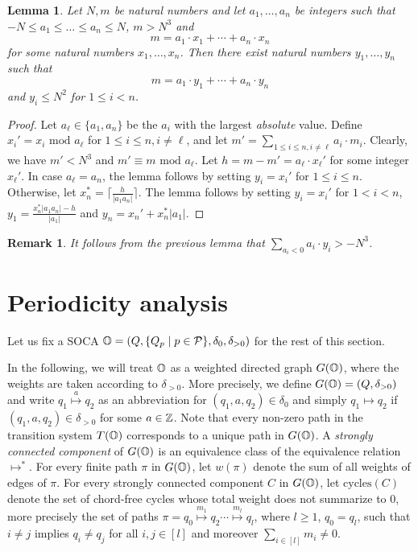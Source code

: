 \documentclass[times,envcountsame]{llncs}
\newtheorem{lemma}[theorem]{{\bf Lemma}}
\newtheorem{remark}[theorem]{{\bf Remark}}
\begin{document}
\begin{lemma}
  \label{lem:bounded-coefficients}
  Let $N,m$ be natural numbers and let $a_1,\ldots, a_n$ be integers
  such that $-N\le a_1 \le \ldots \le a_n\le N$, $m>N^3$ and
  \begin{equation*}
    m = a_1 \cdot x_1 + \cdots + a_n \cdot x_n
  \end{equation*}
  for some natural numbers $x_1, \ldots, x_n$. Then there exist
  natural numbers $y_1, \ldots, y_n$ such that
  \begin{equation*}
    m = a_1 \cdot y_1 + \cdots + a_n \cdot y_n
  \end{equation*}
  and $y_i\le N^2$ for $1\le i<n$.
\end{lemma}
\begin{proof}
  Let $a_\ell\in\{a_1,a_n\}$ be the $a_i$ with the largest
  \emph{absolute} value. Define $x_i' =x_i \text{ mod } a_\ell$ for
  $1\le i\le n, i\neq \ell$, and let $m'= \sum_{1\le i\le n, i\neq
    \ell} a_i\cdot m_i$. Clearly, we have $m'<N^3$ and $m'\equiv m
  \text{ mod } a_\ell$. Let $h=m-m'=a_\ell \cdot x_\ell'$ for some
  integer $x_\ell'$. In case $a_\ell=a_n$, the lemma follows by
  setting $y_i=x_i'$ for $1\le i\le n$. Otherwise, let $x_n^*= \lceil
  \frac{h}{|a_1a_n|} \rceil$. The lemma follows by setting $y_i=x_i'$
  for $1<i<n$, $y_1=\frac{x_n^*|a_1a_n|-h}{|a_1|}$ and $y_n=x_n'+
  x_n^*|a_1|$.
\end{proof}
\begin{remark}
  \label{rem:maximum-valley}
  It follows from the previous lemma that $\sum_{a_i<0} a_i\cdot
  y_i>-N^3$.
\end{remark}

\section{Periodicity analysis}

\newcommand{\cycles}{\textrm{cycles}}

Let us fix a SOCA $\mathbb{O}=(Q,\{Q_p\mid p\in\mathcal{P}\},\delta_0,\delta_{>0})$ for
 the rest of this section.

In the following, we will treat $\mathbb{O}$ as a weighted directed graph $G(\mathbb{O})$, where
the weights are taken according to $\delta_{>0}$.
More precisely, we define $G(\mathbb{O})=(Q,\delta_{>0})$
and write $q_1\stackrel{a}{\mapsto}q_2$ as an abbreviation for
$(q_1,a,q_2)\in\delta_{0}$ and simply $q_1\mapsto q_2$ if
$(q_1,a,q_2)\in\delta_{>0}$ for some $a\in\mathbb{Z}$.
Note that every non-zero path in the transition system $T(\mathbb{O})$ corresponds to a unique path in
$G(\mathbb{O})$.
A {\em strongly connected component} of $G(\mathbb{O})$ is an
equivalence class of the equivalence relation $\mapsto^*$.
For every finite path $\pi$ in $G(\mathbb{O})$, let $w(\pi)$ denote the sum of all
weights of edges of $\pi$.
For every strongly connected component $C$ in $G(\mathbb{O})$, let $\cycles(C)$ denote
the set of chord-free cycles whose total weight does not summarize to $0$,
more precisely
the set of paths $\pi=q_0\stackrel{m_1}{\mapsto} q_2\cdots
\stackrel{m_l}{\mapsto} q_l$, where $l\geq1$,
$q_0=q_l$, such that $i\not= j$ implies $q_i\not=q_j$ for all
$i,j\in[l]$ and moreover $\sum_{i\in[l]}m_i\not=0$.
\end{document}
